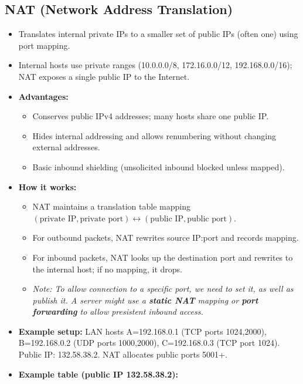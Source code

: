 \subsection{NAT (Network Address Translation)}
\begin{itemize}
	\item Translates internal private IPs to a smaller set of public IPs (often one) using port mapping.
	\item Internal hosts use private ranges (10.0.0.0/8, 172.16.0.0/12, 192.168.0.0/16); NAT exposes a single public IP to the Internet.
	\item \textbf{Advantages:}
	\begin{itemize}
		\item Conserves public IPv4 addresses; many hosts share one public IP.
		\item Hides internal addressing and allows renumbering without changing external addresses.
		\item Basic inbound shielding (unsolicited inbound blocked unless mapped).
	\end{itemize}
	\item \textbf{How it works:}
	\begin{itemize}
		\item NAT maintains a translation table mapping $(\text{private IP}, \text{private port}) \leftrightarrow (\text{public IP}, \text{public port})$.
		\item For outbound packets, NAT rewrites source IP:port and records mapping.
		\item For inbound packets, NAT looks up the destination port and rewrites to the internal host; if no mapping, it drops.
		\item[] \textit{Note: To allow connection to a specific port, we need to set it, as well as publish it. A server might use a \textbf{static NAT} mapping or \textbf{port forwarding} to allow presistent inbound access.}
	\end{itemize}
	\item \textbf{Example setup:} LAN hosts A=192.168.0.1 (TCP ports 1024,2000), B=192.168.0.2 (UDP ports 1000,2000), C=192.168.0.3 (TCP port 1024). Public IP: 132.58.38.2. NAT allocates public ports 5001+.
	\item \textbf{Example table (public IP 132.58.38.2):}
	\noindent\hspace*{-\leftmargin}
\end{itemize}
